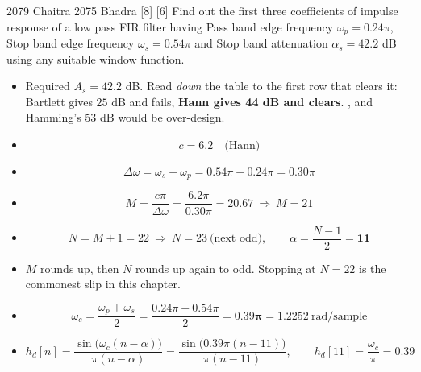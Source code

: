 \hr

{\color{sub}\footnotesize {} }

\begin{asked}{2079 Chaitra \textperiodcentered{} 2075 Bhadra \textperiodcentered{} [8] [6]}
Find out the first three coefficients of impulse response of a low pass FIR filter having
Pass band edge frequency $\omega_p=0.24\pi$, Stop band edge frequency
$\omega_s=0.54\pi$ and Stop band attenuation $\alpha_s=42.2$ dB using any suitable window
function.
\end{asked}

\begin{itemize}
  \item Required $A_s=42.2$ dB. Read \emph{down} the table to the first row that clears
        it: Bartlett gives $25$ dB and fails, \textbf{Hann gives 44 dB and clears}.
        , and Hamming's 53 dB would be over-design.
  \item[] \[ c=6.2 \quad\text{(Hann)} \]
\end{itemize}

\begin{itemize}
  \item[] \[ \Delta\omega=\omega_s-\omega_p=0.54\pi-0.24\pi=0.30\pi \]
  \item[] \[ M=\frac{c\pi}{\Delta\omega}=\frac{6.2\pi}{0.30\pi}=20.67
             \ \Rightarrow\ M=21 \]
  \item[] \[ N=M+1=22\ \Rightarrow\ \boxed{N=23}\ \text{(next odd)},\qquad
             \alpha=\frac{N-1}{2}=\mathbf{11} \]
  \item {} $M$ rounds up, then $N$ rounds up again to odd.
        Stopping at $N=22$ is the commonest slip in this chapter.
\end{itemize}

\begin{itemize}
  \item[] \[ \omega_c=\frac{\omega_p+\omega_s}{2}=\frac{0.24\pi+0.54\pi}{2}
             =\mathbf{0.39\pi}=1.2252\ \text{rad/sample} \]
  \item[] \[ h_d[n]=\frac{\sin\big(\omega_c(n-\alpha)\big)}{\pi(n-\alpha)}
             =\frac{\sin\big(0.39\pi(n-11)\big)}{\pi(n-11)},\qquad
             h_d[11]=\frac{\omega_c}{\pi}=\mathbf{0.39} \]
\end{itemize}

